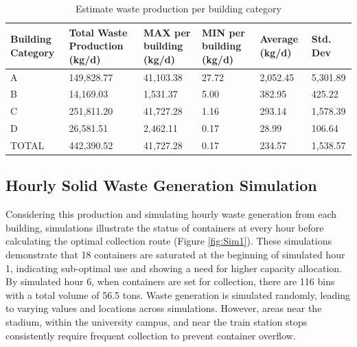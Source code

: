 \documentclass[authoryear,preprint,review,11pt,doubleblind]{elsarticle}
\begin{document}
    \begin{table}[!h]
        \centering
        \caption{Estimate waste production per building category}
        \scriptsize
        \label{tab:Waste2}
        \begin{tabularx}{\linewidth}{l LLLLL}
            \toprule
            Building Category&Total Waste Production (kg/d)&MAX per building (kg/d)&MIN per building (kg/d)&Average (kg/d)& Std. Dev\\ 
            \midrule
            A&149,828.77&41,103.38&27.72&2,052.45&5,301.89\\
            B&14,169.03&1,531.37&5.00&382.95&425.22\\
            C&251,811.20&41,727.28&1.16&293.14&1,578.39\\
            D&26,581.51&2,462.11&0.17&28.99&106.64\\
            \midrule
            TOTAL&442,390.52&41,727.28&0.17&234.57&1,538.57\\
            \bottomrule
        \end{tabularx}
    \end{table}

    \subsection{Hourly Solid Waste Generation Simulation} \label{subsec:Simulation}

    Considering this production and simulating hourly waste generation from each building, simulations illustrate the status of containers at every hour before calculating the optimal collection route (Figure \ref{fig:Sim1}). These simulations demonstrate that 18 containers are saturated at the beginning of simulated hour 1, indicating sub-optimal use and showing a need for higher capacity allocation. By simulated hour 6, when containers are set for collection, there are 116 bins with a total volume of 56.5 tons. Waste generation is simulated randomly, leading to varying values and locations across simulations. However, areas near the stadium, within the university campus, and near the train station stops consistently require frequent collection to prevent container overflow.
\end{document}
